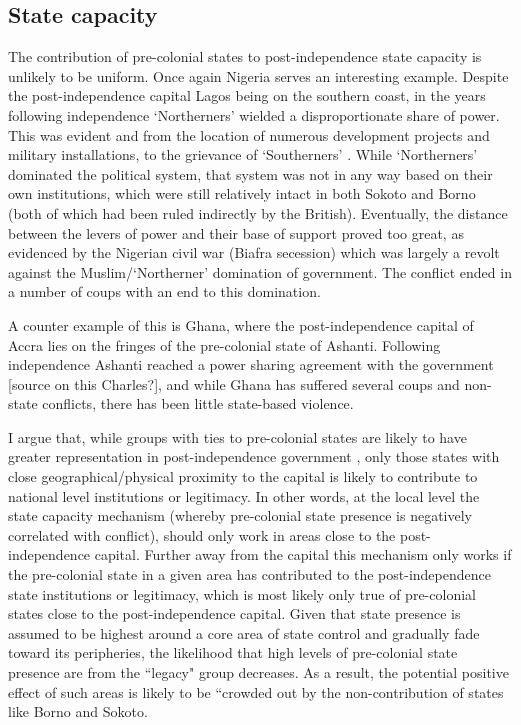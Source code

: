 \documentclass[12pt]{article}
\begin{document}
\subsection{State capacity} \label{State capacity}

The contribution of pre-colonial states to post-independence state capacity is
unlikely to be uniform. Once again Nigeria serves an interesting example.
Despite the post-independence capital Lagos being on the southern coast, in the
years following independence `Northerners' wielded a disproportionate share of
power. This was evident and from the location of numerous development projects
and military installations, to the grievance of `Southerners'
\citep{Bates2008a}. While `Northerners' dominated the political system, that
system was not in any way based on their own institutions, which were still
relatively intact in both Sokoto and Borno (both of which had been ruled
indirectly by the British). Eventually, the distance between the levers of power
and their base of support proved too great, as evidenced by the Nigerian civil
war (Biafra secession) which was largely a revolt against the
Muslim/`Northerner' domination of government. The conflict ended in a number of
coups with an end to this domination. 

A counter example of this is Ghana, where the post-independence capital of Accra
lies on the fringes of the pre-colonial state of Ashanti. Following independence
Ashanti reached a power sharing agreement with the government [source on this
Charles?], and while Ghana has suffered several coups and non-state conflicts,
there has been little state-based violence.

I argue that, while groups with ties to pre-colonial states are likely to have
greater representation in post-independence government \citep{Paine2019}, only
those states with close geographical/physical proximity to the capital is likely
to contribute to national level institutions or legitimacy. In other words, at
the local level the state capacity mechanism (whereby pre-colonial state
presence is negatively correlated with conflict), should only work in areas
close to the post-independence capital. Further away from the capital this
mechanism only works if the pre-colonial state in a given area has contributed
to the post-independence state institutions or legitimacy, which is most likely
only true of pre-colonial states close to the post-independence capital. Given
that state presence is assumed to be highest around a core area of state control
and gradually fade toward its peripheries, the likelihood that high levels of
pre-colonial state presence are from the ``legacy" group decreases. As a
result, the potential positive effect of such areas is likely to be ``crowded
out by the non-contribution of states like Borno and Sokoto.
\end{document}
